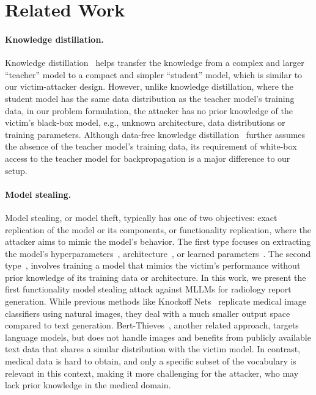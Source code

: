 \section{Related Work}
\paragraph{Knowledge distillation.}
Knowledge distillation~\citep{model-compression, kd} helps transfer the knowledge from a complex and larger ``teacher'' model to a compact and simpler ``student'' model, which is similar to our victim-attacker design. 
However, unlike knowledge distillation, where the student model has the same data distribution as the teacher model's training data, in our problem formulation, the attacker has no prior knowledge of the victim's black-box model, e.g., unknown architecture, data distributions or training parameters. 
Although data-free knowledge distillation~\citep{dfad, zero-kd, dfkd} further assumes the absence of the teacher model's training data, its requirement of white-box access to the teacher model for backpropagation is a major difference to our setup.
\paragraph{Model stealing.}
Model stealing, or model theft, typically has one of two objectives: exact replication of the model or its components, or functionality replication, where the attacker aims to mimic the model's behavior.
The first type focuses on extracting the model's hyperparameters~\citep{wang2018stealing}, architecture~\citep{joon18iclr}, or learned parameters~\citep{steal-api}. The second type~\citep{knockoff, dfme, zhuang2024stealthy}, involves training a model that mimics the victim's performance without prior knowledge of its training data or architecture.
In this work, we present the first functionality model stealing attack against \acp{MLLM} for radiology report generation. While previous methods like Knockoff Nets~\citep{knockoff} replicate medical image classifiers using natural images, they deal with a much smaller output space compared to text generation. Bert-Thieves~\citep{krishna2019thieves}, another related approach, targets language models, but does not handle images and benefits from publicly available text data that shares a similar distribution with the victim model.
In contrast, medical data is hard to obtain, and only a specific subset of the vocabulary is relevant in this context, making it more challenging for the attacker, who may lack prior knowledge in the medical domain.
